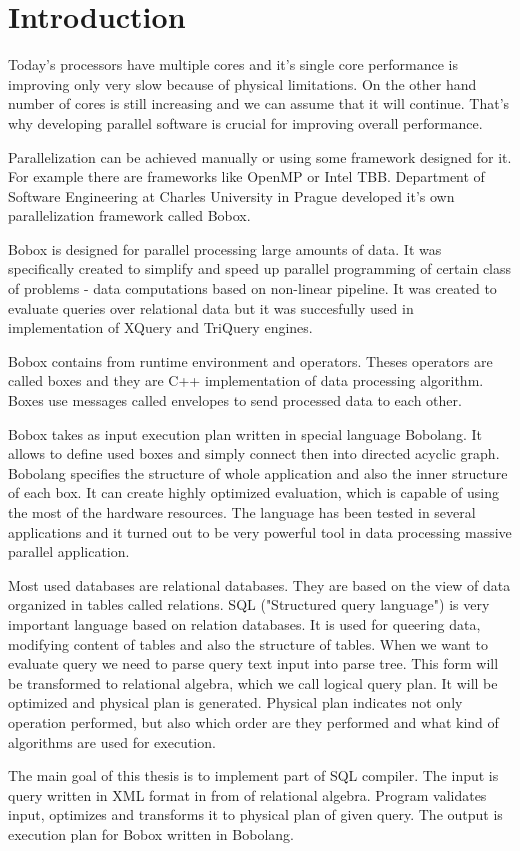 \chapter*{Introduction}
Today's processors have multiple cores and it's single core performance is improving only very slow because of physical limitations. On the other hand number of cores is still increasing and we can assume that it will continue. That's why developing parallel software is crucial for improving overall performance.

Parallelization can be achieved manually or using some framework designed for it. For example there are frameworks like OpenMP or Intel TBB. Department of Software Engineering at Charles University in Prague developed it's own parallelization framework called Bobox.

Bobox is designed for parallel processing large amounts of data. It was specifically created to simplify and speed up parallel programming of certain class of problems - data computations based on non-linear pipeline. It was created to evaluate queries over relational data but it was succesfully used in implementation of XQuery and TriQuery engines.

Bobox contains from runtime environment and operators. Theses operators are called boxes and they are C++ implementation of data processing algorithm. Boxes use messages called envelopes to send processed data to each other. 

Bobox takes as input execution plan written in special language Bobolang. It allows to define used boxes and simply connect then into directed acyclic graph. Bobolang specifies the structure of whole application and also the inner structure of each box. It can create highly optimized evaluation, which is capable of using the most of the hardware resources. The language has been tested in several applications and it turned out to be very powerful tool in data processing massive parallel application.

Most used databases are relational databases. They are based on the view of data organized in tables called relations. SQL ("Structured query language") is very important language based on relation databases. It is used for queering data, modifying content of tables and also the structure of tables. When we want to evaluate query we need to parse query text input into parse tree. This form will be transformed to relational algebra, which we call logical query plan. It will be optimized and physical plan is generated. Physical plan indicates not only operation performed, but also which order are they performed and what kind of algorithms are used for execution.

The main goal of this thesis is to implement part of SQL compiler. The input is query written in XML format in from of relational algebra. Program validates input, optimizes and transforms it to physical plan of given query. The output is execution plan for Bobox written in Bobolang.
